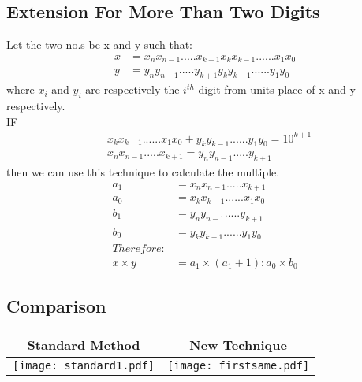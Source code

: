 \documentclass[]{article}
\begin{document}
\subsection{Extension For More Than Two Digits}
Let the two no.s be x and y such that:
\begin{align*}
x &= x_nx_{n-1}.....x_{k+1}x_kx_{k-1}......x_1x_0\\
y &=  y_ny_{n-1}.....y_{k+1}y_ky_{k-1}......y_1y_0
\end{align*}
where $x_i$ and $y_i$ are respectively the $i^{th}$ digit from units place of x and y respectively.\\
IF\\
\begin{align*}
&x_kx_{k-1}......x_1x_0 + y_ky_{k-1}......y_1y_0 = 10^{k+1}\\
&x_nx_{n-1}.....x_{k+1} = y_ny_{n-1}.....y_{k+1}
\end{align*}
then we can use this technique to calculate the multiple.\\
\begin{align*}
a_1 &=  x_nx_{n-1}.....x_{k+1}\\
a_0 &=  x_kx_{k-1}......x_1x_0\\
b_1 &= y_ny_{n-1}.....y_{k+1}\\
b_0 &= y_ky_{k-1}......y_1y_0\\
Therefore:\\
x \times y &= a_1 \times (a_1 + 1) : a_0 \times b_0
\end{align*}

\subsection{Comparison}
\begin{table}[!h]
\begin{center}
\begin{tabular}{|c|c|}
\hline
Standard Method& New Technique\\
\hline
\texttt{[image: standard1.pdf]}&\texttt{[image: firstsame.pdf]}\\
\hline
\end{tabular}
\end{center}
\end{table}
\end{document}
